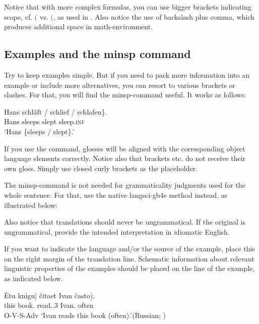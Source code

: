 \noindent Notice that with more complex formulas, you can use bigger brackets indicating scope, cf. $($ vs. $\big($, as used in . Also notice the use of backslash plus comma, which produces additional space in math-environment.

\subsection{Examples and the minsp command}

Try to keep examples simple. But if you need to pack more information into an example or include more alternatives, you can resort to various brackets or slashes. For that, you will find the minsp-command useful. It works as follows:

\ea\label{sim:ex:german-verbs}\gll Hans \minsp{\{} schläft / schlief / \minsp{*} schlafen\}.\\
Hans {} sleeps {} slept {} {} sleep.\textsc{inf}\\
\glt `Hans \{sleeps / slept\}.'
\z

\noindent If you use the command, glosses will be aligned with the corresponding object language elements correctly. Notice also that brackets etc. do not receive their own gloss. Simply use closed curly brackets as the placeholder.

The minsp-command is not needed for grammaticality judgments used for the whole sentence. For that, use the native langsci-gb4e method instead, as illustrated below:

\z

\noindent Also notice that translations should never be ungrammatical. If the original is ungrammatical, provide the intended interpretation in idiomatic English.

If you want to indicate the language and/or the source of the example, place this on the right margin of the translation line. Schematic information about relevant linguistic properties of the examples should be placed on the line of the example, as indicated below.

\ea\label{sim:ex:bailyn}\gll \minsp{[} Ėtu knigu] čitaet Ivan \minsp{(} často).\\
{} this book.{\ACC} read.{\PRS.3\SG} Ivan.{\NOM} {} often\\\hfill O-V-S-Adv
\glt `Ivan reads this book (often).'\hfill (Russian; \citealt[4]{Bailyn2004})
\z

